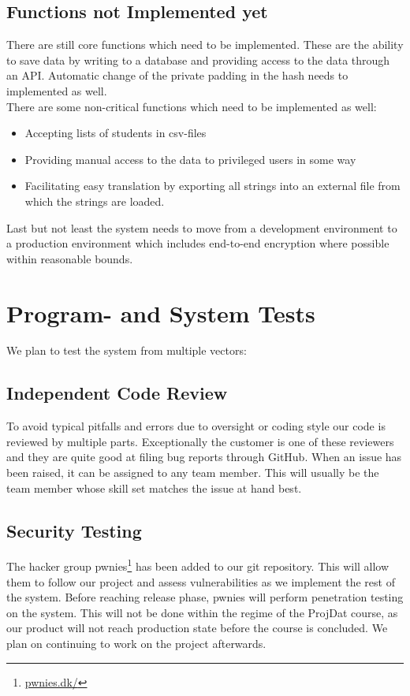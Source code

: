 \documentclass[11pt,a4paper]{report}
\begin{document}
\subsection{Functions not Implemented yet}
There are still core functions which need to be implemented. These are the ability to save data by writing to a database and providing access to the data through an API. Automatic change of the private padding in the hash needs to implemented as well. \\
There are some non-critical functions which need to be implemented as well:
\begin{itemize}
    \item Accepting lists of students in csv-files
    \item Providing manual access to the data to privileged users in some way
    \item Facilitating easy translation by exporting all strings into an external file from which the strings are loaded.
\end{itemize}
Last but not least the system needs to move from a development environment to a production environment which includes end-to-end encryption where possible within reasonable bounds.

\section{Program- and System Tests}\label{sec:Program_systemtests}
We plan to test the system from multiple vectors:
\subsection{Independent Code Review}
To avoid typical pitfalls and errors due to oversight or coding style our code is reviewed by multiple parts. Exceptionally the customer is one of these reviewers and they are quite good at filing bug reports through GitHub.
 When an issue has been raised, it can be assigned to any team member. This will usually be the team member whose skill set matches the issue at hand best.
\subsection{Security Testing}

The hacker group pwnies\footnote{\href{https://pwnies.dk/}{pwnies.dk/}} has been added to our git repository. This will allow them to follow our project and assess vulnerabilities as  we implement the rest of the system. Before reaching release phase, pwnies will perform penetration testing on the system. This will not be done within the regime of the ProjDat course, as our product will not reach production state before the course is concluded. We plan on continuing to work on the project afterwards.\cite{wiki:sectest}
\end{document}
